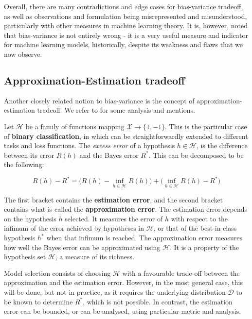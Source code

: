 Overall, there are many contradictions and edge cases for bias-variance tradeoff, as well as observations and formulation being misrepresented and misunderstood, particularly with other measures in machine learning theory. It is, however, noted that bias-variance is not entirely wrong - it is a very useful measure and indicator for machine learning models, historically, despite its weakness and flaws that we now observe. 
\subsection{Approximation-Estimation tradeoff}

Another closely related notion to bias-variance is the concept of approximation-estimation tradeoff. We refer to \cite{10.5555/2371238,lafon_understanding_2024} for some analysis and mentions. 

Let $\mathcal{H}$ be a family of functions mapping $\mathcal{X}\to\{1,-1\}$. This is the particular case of \textbf{binary classification}, in which can be straightforwardly extended to different tasks and loss functions. The \textit{excess error} of a hypothesis $h\in\mathcal{H}$, is the difference between its error $R(h)$ and the Bayes error $R^{*}$. This can be decomposed to be the following: 

\begin{equation}
    R(h) - R^{*} = \Big( R(h) - \inf_{h\in \mathcal{H}} R(h) \Big) + \Big( \inf_{h\in \mathcal{H}} R(h) - R^{*} \Big)
\end{equation}

The first bracket contains the \textbf{estimation error}, and the second bracket contains what is called the \textbf{approximation error}. The estimation error depends on the hypothesis $h$ selected. It measures the error of $h$ with respect to the infimum of the error achieved by hypotheses in $\mathcal{H}$, or that of the best-in-class hypothesis $h^{*}$ when that infimum is reached. The approximation error measures how well the Bayes error can be approximated using $\mathcal{H}$. It is a property of the hypothesis set $\mathcal{H}$, a measure of its richness. 

Model selection consists of choosing $\mathcal{H}$ with a favourable trade-off between the approximation and the estimation error. However, in the most general case, this will be done, but not in practice, as it requires the underlying distribution $\mathcal{D}$ to be known to determine $R^{*}$, which is not possible. In contrast, the estimation error can be bounded, or can be analysed, using particular metric and analysis. 

